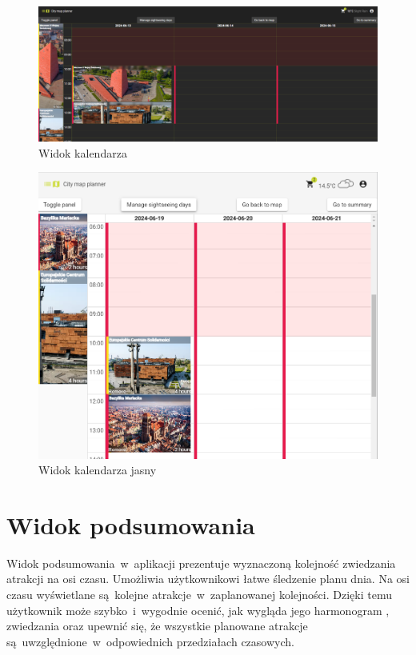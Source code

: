 \begin{figure}[H]
        \centering
        \includegraphics[width=1\textwidth]{attachments/kalendarz}
        \caption{Widok kalendarza}
        \label{fig:kalendarz}
\end{figure}
\begin{figure}[H]
    \centering
    \includegraphics[width=1\textwidth]{attachments/kalendarz-light}
    \caption{Widok kalendarza jasny}
    \label{fig:kalendarz-light}
\end{figure}

\section{Widok podsumowania}
\label{sec:podsumowanie}
Widok podsumowania~w~aplikacji prezentuje wyznaczoną kolejność zwiedzania atrakcji na osi czasu. Umożliwia użytkownikowi łatwe śledzenie planu dnia.
Na osi czasu wyświetlane są~kolejne atrakcje~w~zaplanowanej kolejności.
Dzięki temu użytkownik może szybko~i~wygodnie ocenić, jak wygląda jego harmonogram ,
zwiedzania oraz upewnić się, że wszystkie planowane atrakcje są~uwzględnione~w~odpowiednich przedziałach czasowych.

